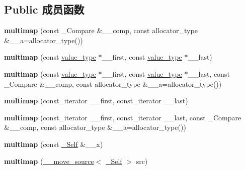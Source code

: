 \subsection*{Public 成员函数}
\begin{DoxyCompactItemize}
\item 
\mbox{\label{classmultimap_a41aaf8326fb18da6f157036b00de0279}} 
{\bfseries multimap} (const \+\_\+\+Compare \&\+\_\+\+\_\+comp, const allocator\+\_\+type \&\+\_\+\+\_\+a=allocator\+\_\+type())
\item 
\mbox{\label{classmultimap_ac808e5b70b068047f4f99f7ea2544783}} 
{\bfseries multimap} (const \hyperlink{structpair}{value\+\_\+type} $\ast$\+\_\+\+\_\+first, const \hyperlink{structpair}{value\+\_\+type} $\ast$\+\_\+\+\_\+last)
\item 
\mbox{\label{classmultimap_a38df0a16baa17d79fadaee702496b5c9}} 
{\bfseries multimap} (const \hyperlink{structpair}{value\+\_\+type} $\ast$\+\_\+\+\_\+first, const \hyperlink{structpair}{value\+\_\+type} $\ast$\+\_\+\+\_\+last, const \+\_\+\+Compare \&\+\_\+\+\_\+comp, const allocator\+\_\+type \&\+\_\+\+\_\+a=allocator\+\_\+type())
\item 
\mbox{\label{classmultimap_a70a5bf3f4de7db94246c1ee68f0e3549}} 
{\bfseries multimap} (const\+\_\+iterator \+\_\+\+\_\+first, const\+\_\+iterator \+\_\+\+\_\+last)
\item 
\mbox{\label{classmultimap_af4c11bd84298b5db9ca65573e1566e94}} 
{\bfseries multimap} (const\+\_\+iterator \+\_\+\+\_\+first, const\+\_\+iterator \+\_\+\+\_\+last, const \+\_\+\+Compare \&\+\_\+\+\_\+comp, const allocator\+\_\+type \&\+\_\+\+\_\+a=allocator\+\_\+type())
\item 
\mbox{\label{classmultimap_aa60c85e6bcce0fcb6c16597ab07b0ade}} 
{\bfseries multimap} (const \hyperlink{classmultimap}{\+\_\+\+Self} \&\+\_\+\+\_\+x)
\item 
\mbox{\label{classmultimap_a4cb1256bfdbd76d6c361c65b98847961}} 
{\bfseries multimap} (\hyperlink{class____move__source}{\+\_\+\+\_\+move\+\_\+source}$<$ \hyperlink{classmultimap}{\+\_\+\+Self} $>$ src)
\item 
\mbox{\label{classmultimap_a7874f382115c8d10d6f6169c0240753e}} 

\end{DoxyCompactItemize}

